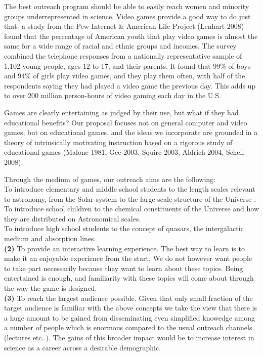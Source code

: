 \documentclass[12pt]{article}
\begin{document}
\begin{small}
The best outreach program should be able to easily reach women and
minority groups underrepresented in science. Video games provide
a good way to do just that- a  study from the  Pew Internet 
\& American Life 
Project (Lenhart 2008) found that the percentage of American youth
that play video games is almost the same for a wide range of racial and
ethnic groups and incomes. The survey combined the telephone responses 
from a nationally representative sample of 1,102 young people, ages 12 to 
17, and their parents. It found that 99\% of boys and 94\% of girls
play video games, and they play them often, with  half of the respondents 
saying they had played a video game the previous day. This adds up to
over 200 million person-hours of video gaming each day in the U.S.

Games are clearly entertaining as judged by their use, 
but what if they had educational benefits? 
Our proposal 
focuses not on general computer and video games, but on educational games,
and the ideas we incorporate are 
grounded in a theory of intrinsically motivating instruction 
based on a rigorous study of educational games 
(Malone 1981, Gee 2003,
Squire 2003, Aldrich 2004, Schell 2008).


Through the medium of  games, our outreach aims are the following:\\
 To introduce  elementary and middle
school students to the length scales relevant
to astronomy, from the Solar system to the large scale structure of the Universe
.\\
  To introduce school children to the chemical constituents
 of the Universe and how they are distributed on Astronomical scales.\\
 To introduce high school students to the concept
of quasars, the  intergalactic medium and absorption lines.\\
{\bf (2)} To provide an interactive 
learning experience. The best way to learn is
to make it an enjoyable  experience from the start. We do not
however want people to take part necessarily
because they want to learn about these
topics. Being entertained is enough, and familiarity with these topics
will come about through the way the game is designed.\\
{\bf (3)}
To reach the largest audience possible. Given that only small fraction of 
the target audience is familiar with  the above concepts  we take the view 
that 
there is a huge amount to be gained from disseminating even simplified 
knowedge among a number of people which is enormous compared to the usual 
outreach channels (lectures  etc..). The gains of this broader 
impact would be to increase interest in science as a career across 
a desirable demographic.
  


\end{small}
\end{document}
